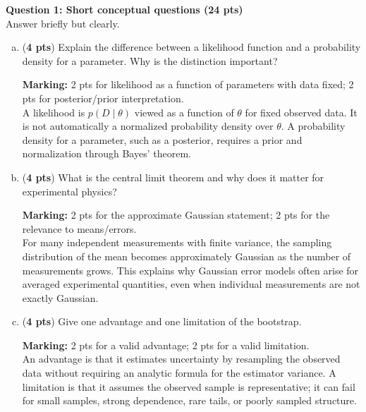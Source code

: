 \documentclass{article}
\newcommand{\givesolutions}{true}
\newcommand{\answer}[2]{%
\ifthenelse{\equal{#2}{true}}%
{{\color{blue}#1}}%
{}%
}
\newenvironment{ansbox}[1]{%
  \begin{lrbox}{\mybox}\begin{minipage}[t][#1]{\linewidth}%
}{%
  \vfill\hfill\end{minipage}\end{lrbox}\fbox{\usebox{\mybox}}%
}
\begin{document}
\newpage

\noindent\large{{\bf{Question 1: Short conceptual questions (24 pts)}}}\\

Answer briefly but clearly.

\begin{enumerate}[(a)]
    \item ({\bf 4 pts}) Explain the difference between a likelihood function and a probability density for a parameter. Why is the distinction important? \\
    \begin{ansbox}{1.2in}
    \answer{\textbf{Marking:} 2 pts for likelihood as a function of parameters with data fixed; 2 pts for posterior/prior interpretation.\\A likelihood is $p(D\mid\theta)$ viewed as a function of $\theta$ for fixed observed data. It is not automatically a normalized probability density over $\theta$. A probability density for a parameter, such as a posterior, requires a prior and normalization through Bayes' theorem.}{\givesolutions}
    \end{ansbox}

    \item ({\bf 4 pts}) What is the central limit theorem and why does it matter for experimental physics? \\
    \begin{ansbox}{1.2in}
    \answer{\textbf{Marking:} 2 pts for the approximate Gaussian statement; 2 pts for the relevance to means/errors.\\For many independent measurements with finite variance, the sampling distribution of the mean becomes approximately Gaussian as the number of measurements grows. This explains why Gaussian error models often arise for averaged experimental quantities, even when individual measurements are not exactly Gaussian.}{\givesolutions}
    \end{ansbox}

    \item ({\bf 4 pts}) Give one advantage and one limitation of the bootstrap. \\
    \begin{ansbox}{1.2in}
    \answer{\textbf{Marking:} 2 pts for a valid advantage; 2 pts for a valid limitation.\\An advantage is that it estimates uncertainty by resampling the observed data without requiring an analytic formula for the estimator variance. A limitation is that it assumes the observed sample is representative; it can fail for small samples, strong dependence, rare tails, or poorly sampled structure.}{\givesolutions}
    \end{ansbox}


\end{enumerate}
\end{document}
